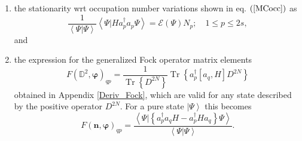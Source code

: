 \documentclass[titlepage]{article}%
\begin{document}
\begin{enumerate}
\item the stationarity wrt occupation number variations shown in eq. $\left(
\ref{MCocc}\right)  $ as
\begin{equation}
\frac{1}{\left\langle \left.  \Psi\right\vert \Psi\right\rangle }\left\langle
\left.  \Psi\right\vert Ha_{p}^{\dagger}a_{p}\Psi\right\rangle =\mathcal{E}%
\left(  \Psi\right)  N_{p};\quad1\leq p\leq2s,
\end{equation}
and

\item the expression for the generalized Fock operator matrix elements
\cite{YellowBook}
\begin{equation}
F\left(  \mathbb{D}^{2},\bm{\varphi}\right)  _{qp}=\frac{1}{\operatorname{Tr}%
\left\{  D^{2N}\right\}  }\operatorname{Tr}\left\{  a_{p}^{\dagger}\left[
a_{q},H\right]  D^{2N}\right\}
\end{equation}
obtained in Appendix \ref{Deriv_Fock}, which are valid for any state described
by the positive operator $D^{2N}$. For a pure state $\left\vert \Psi
\right\rangle $ this becomes
\begin{equation}
F\left(  \bm{n},\bm{\varphi}\right)  _{qp}=\frac{\left\langle \left.
\Psi\right\vert \left\{  a_{p}^{\dagger}a_{q}H-a_{p}^{\dagger}Ha_{q}\right\}
\Psi\right\rangle }{\left\langle \left.  \Psi\right\vert \Psi\right\rangle }.
\end{equation}

\end{enumerate}
\end{document}
